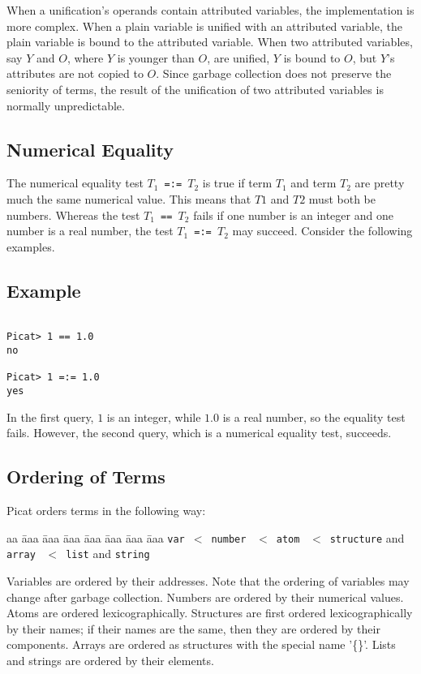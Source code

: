 When a unification's operands contain attributed variables, the implementation is more complex. When a plain variable is unified with an attributed variable, the plain variable is bound to the attributed variable. When two attributed variables, say $Y$ and $O$, where $Y$ is younger than $O$, are unified,  $Y$ is bound to $O$, but $Y$'s attributes are not copied to $O$. Since garbage collection does not preserve the seniority of terms, the result of the unification of two attributed variables is normally unpredictable.

\subsection{Numerical Equality}
The numerical equality test \texttt{$T_1$ =:= $T_2$}  is true if term $T_1$ and term $T_2$ are pretty much the same numerical value.  This means that $T1$ and $T2$ must both be numbers.  Whereas the test \texttt{$T_1$ == $T_2$} fails if one number is an integer and one number is a real number, the test \texttt{$T_1$ =:= $T_2$} may succeed.  Consider the following examples.
\subsection*{Example}

\begin{verbatim}
    
Picat> 1 == 1.0
no

Picat> 1 =:= 1.0
yes
\end{verbatim}
In the first query, $1$ is an integer, while $1.0$ is a real number, so the equality test fails.  However, the second query, which is a numerical equality test, succeeds.  

\subsection{Ordering of Terms}
Picat orders terms in the following way:
\begin{tabbing}
aa \= aaa \= aaa \= aaa \= aaa \= aaa \= aaa \= aaa \kill
\> \texttt{var}\ $<$\ \texttt{number} \ $<$\ \texttt{atom} \ $<$\ \texttt{structure} and \texttt{array} \ $<$\ \texttt{list} and \texttt{string}
\end{tabbing}
Variables are ordered by their addresses. Note that the ordering of variables may change after garbage collection. Numbers are ordered by their numerical values. Atoms are ordered lexicographically. Structures are first ordered lexicographically by their names; if their names are the same, then they are ordered by their components. Arrays are ordered as structures with the special name '\{\}'. Lists and strings are ordered by their elements.

